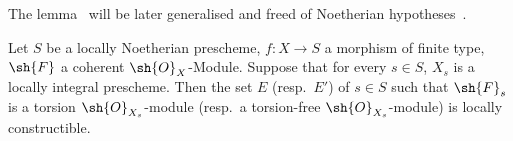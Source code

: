 \begin{remark}[9.4.7.2]
\label{IV.9.4.7.2}
The lemma~ will be later generalised and freed of Noetherian hypotheses~.
\end{remark}

\begin{proposition}[9.4.8]
\label{IV.9.4.8}
Let $S$ be a locally Noetherian prescheme, $f:X\to S$ a morphism of finite type, $\sh{F}$ a coherent $\sh{O}_X$-Module.
Suppose that for every $s\in S$, $X_s$ is a locally integral prescheme.
Then the set $E$ \textnormal{(}resp.\ $E'$\textnormal{)} of $s\in S$ such that $\sh{F}_s$ is a torsion $\sh{O}_{X_s}$-module \textnormal{(}resp.\ a torsion-free $\sh{O}_{X_s}$-module\textnormal{)} is locally constructible.
\end{proposition}

